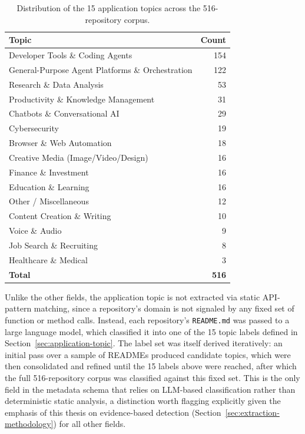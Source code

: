 \begin{table}[htbp]
\centering
\small
\caption{Distribution of the 15 application topics across the 516-repository corpus.}
\label{tab:topic-counts}
\begin{tabular}{@{}lr@{}}
\toprule
\textbf{Topic} & \textbf{Count} \\
\midrule
Developer Tools \& Coding Agents & 154 \\
General-Purpose Agent Platforms \& Orchestration & 122 \\
Research \& Data Analysis & 53 \\
Productivity \& Knowledge Management & 31 \\
Chatbots \& Conversational AI & 29 \\
Cybersecurity & 19 \\
Browser \& Web Automation & 18 \\
Creative Media (Image/Video/Design) & 16 \\
Finance \& Investment & 16 \\
Education \& Learning & 16 \\
Other / Miscellaneous & 12 \\
Content Creation \& Writing & 10 \\
Voice \& Audio & 9 \\
Job Search \& Recruiting & 8 \\
Healthcare \& Medical & 3 \\
\midrule
\textbf{Total} & \textbf{516} \\
\bottomrule
\end{tabular}
\end{table}



Unlike the other fields, the application topic is not extracted via
static API-pattern matching, since a repository's domain is not signaled
by any fixed set of function or method calls. Instead, each repository's
\texttt{README.md} was passed to a large language model, which classified
it into one of the 15 topic labels defined in Section~\ref{sec:application-topic}.
The label set was itself derived iteratively: an initial pass over a sample
of READMEs produced candidate topics, which were then consolidated and
refined until the 15 labels above were reached, after which the full
516-repository corpus was classified against this fixed set. This is the
only field in the metadata schema that relies on LLM-based
classification rather than deterministic static analysis, a distinction
worth flagging explicitly given the emphasis of this thesis on
evidence-based detection (Section~\ref{sec:extraction-methodology})
for all other fields.

